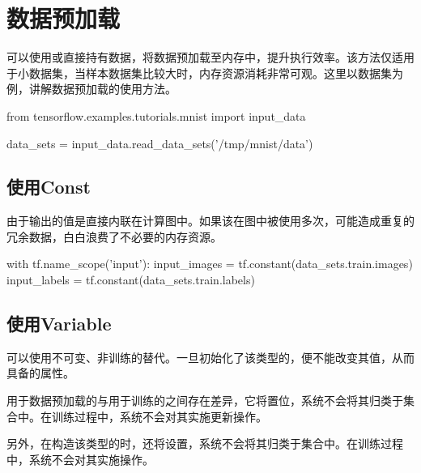 \section{数据预加载}

\begin{content}

可以使用或直接持有数据，将数据预加载至内存中，提升执行效率。该方法仅适用于小数据集，当样本数据集比较大时，内存资源消耗非常可观。这里以数据集为例，讲解数据预加载的使用方法。

\begin{leftbar}
\begin{python}
from tensorflow.examples.tutorials.mnist import input_data

data_sets = input_data.read_data_sets('/tmp/mnist/data')
\end{python}
\end{leftbar}

\subsection{使用Const}

由于输出的值是直接内联在计算图中。如果该在图中被使用多次，可能造成重复的冗余数据，白白浪费了不必要的内存资源。

\begin{leftbar}
\begin{python}
with tf.name_scope('input'):
  input_images = tf.constant(data_sets.train.images)
  input_labels = tf.constant(data_sets.train.labels)
\end{python}
\end{leftbar}

\subsection{使用Variable}

可以使用不可变、非训练的替代。一旦初始化了该类型的，便不能改变其值，从而具备的属性。

用于数据预加载的与用于训练的之间存在差异，它将置位，系统不会将其归类于集合中。在训练过程中，系统不会对其实施更新操作。

另外，在构造该类型的时，还将设置，系统不会将其归类于集合中。在训练过程中，系统不会对其实施操作。


\end{content}
